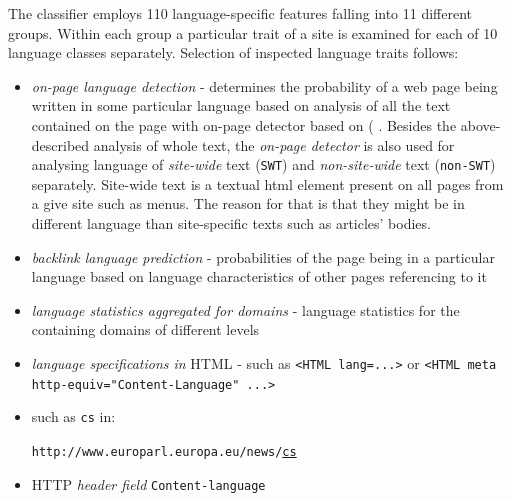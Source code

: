 \documentclass{acm_proc_article-sp}
\begin{document}
{  The classifier employs 110 language-specific features falling into 11 different  groups. Within each group a
  particular trait of a site is examined for each of 10 language classes separately. Selection of
  inspected language traits follows: 
  \begin{itemize}
    \item \textit{on-page language detection} - 
      determines the probability of a web page being written in some particular
      language based on analysis of all the text
      contained on the page with on-page detector based on (\cite{Rehurek:languageidentification} . 
      Besides the above-described analysis of whole text, the \textit{on-page 
      detector} is also used for analysing language of \textit{site-wide} text (\texttt{SWT}) and
    \textit{non-site-wide} text (\texttt{non-SWT}) separately. Site-wide text is a textual html element 
    present on all pages from a give site such as menus. The reason for that is that they might be 
    in different language than site-specific texts such as articles' bodies.
    \item \textit{backlink language prediction} - probabilities of the page being in a particular
      language based on language characteristics of other pages referencing to it 
    \item \textit{language statistics aggregated for domains} - language statistics for the
      containing domains of different levels
    \item \textit{language specifications in} HTML - such as \texttt{<HTML lang=...>} or \texttt{<HTML
      meta http-equiv="Content-Language"  ...>}
    \item {} such as \texttt{cs} in:

    \texttt{http://www.europarl.europa.eu/news/}\underline{\texttt{cs}} 
    \item HTTP \textit{header field} \texttt{Content-language}
  \end{itemize}


}
\end{document}
